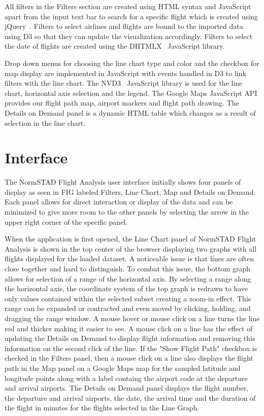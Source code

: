 \documentclass{sig-alternate}
\begin{document}
All filters in the Filters section
 are created using HTML syntax and JavaScript apart from the input text bar
to search for a specific flight which is created using jQuery~\cite{jQuery}.
Filters to select airlines and flights are bound to the imported data using D3 so that
they can update the visualization accordingly. Filters to select the date of flights
are created using the DHTMLX~\cite{DHTMLX} JavaScript library.

Drop down menus for choosing the line chart type and color and the checkbox for map display
are implemented in JavaScript with events handled in D3 to link filters with the line chart.
The NVD3~\cite{NVD3} JavaScript library is used for the line chart, horizontal axis 
selection and the legend. The Google Maps JavaScript API provides our flight path map,
airport markers and flight path drawing. The Details on Demand panel is a dynamic
HTML table which changes as a result of selection in the line chart.

\section{Interface}
\label{sec-interface}

The NormSTAD Flight Analysis user interface initially shows four panels of display as seen in 
FIG labeled Filters, Line Chart, Map and Details on Demand. Each panel allows for 
direct interaction or display of the data and can be minimized to
give more room to the other panels by selecting 
the arrow in the upper right corner of the specific panel. 

When the application is first opened, the Line Chart panel of NormSTAD Flight Analysis is shown in the top
center of the browser displaying two graphs with all flights displayed for the 
loaded dataset. A noticeable issue is that lines are often close together and hard to
distinguish.
 To combat this issue, the bottom graph allows for selection of a range of 
the horizontal axis. By selecting a range along the horizontal axis, the coordinate
system of the top graph is redrawn to have only values contained within the selected subset
creating a zoom-in effect. This range can be expanded or contracted and even moved by clicking,
holding, and dragging the range window. A mouse hover or mouse click on a
line turns the line red and 
thicker making it easier to see. A mouse click on a line has the effect of
updating the Details on Demand
to display flight information and removing this information on the second click of the line. 
If the "Show Flight Path" checkbox is checked in the Filters panel, then a mouse click on a line also displays
the flight path in the Map panel on a Google Maps map for the sampled latitude and longitude points along with a label containg the airport code at the departure and arrival airports.
The Details on Demand panel displays the flight number, the departure and arrival airports, the date,
the arrival time and the duration of the flight in minutes for the flights selected in the
Line Graph.
\end{document}
